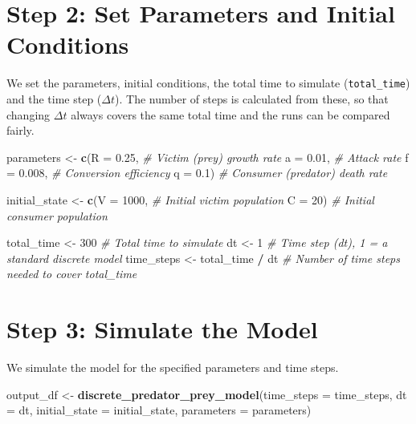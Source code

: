 \documentclass[
  a4paper]{book}
\newenvironment{Shaded}{\begin{snugshade}}{\end{snugshade}}
\newcommand{\AttributeTok}[1]{\textcolor[rgb]{0.13,0.29,0.53}{#1}}
\newcommand{\CommentTok}[1]{\textcolor[rgb]{0.56,0.35,0.01}{\textit{#1}}}
\newcommand{\DecValTok}[1]{\textcolor[rgb]{0.00,0.00,0.81}{#1}}
\newcommand{\FloatTok}[1]{\textcolor[rgb]{0.00,0.00,0.81}{#1}}
\newcommand{\FunctionTok}[1]{\textcolor[rgb]{0.13,0.29,0.53}{\textbf{#1}}}
\newcommand{\NormalTok}[1]{#1}
\newcommand{\OtherTok}[1]{\textcolor[rgb]{0.56,0.35,0.01}{#1}}
\newcommand{\SpecialCharTok}[1]{\textcolor[rgb]{0.81,0.36,0.00}{\textbf{#1}}}
\begin{document}
\section{Step 2: Set Parameters and Initial Conditions}\label{step-2-set-parameters-and-initial-conditions}

We set the parameters, initial conditions, the total time to simulate (\texttt{total\_time}) and the time step (\(\Delta t\)). The number of steps is calculated from these, so that changing \(\Delta t\) always covers the same total time and the runs can be compared fairly.

\begin{Shaded}
\begin{Highlighting}[]
\NormalTok{parameters }\OtherTok{\textless{}{-}} \FunctionTok{c}\NormalTok{(}\AttributeTok{R =} \FloatTok{0.25}\NormalTok{,  }\CommentTok{\# Victim (prey) growth rate}
                \AttributeTok{a =} \FloatTok{0.01}\NormalTok{,  }\CommentTok{\# Attack rate}
                \AttributeTok{f =} \FloatTok{0.008}\NormalTok{, }\CommentTok{\# Conversion efficiency}
                \AttributeTok{q =} \FloatTok{0.1}\NormalTok{)   }\CommentTok{\# Consumer (predator) death rate}

\NormalTok{initial\_state }\OtherTok{\textless{}{-}} \FunctionTok{c}\NormalTok{(}\AttributeTok{V =} \DecValTok{1000}\NormalTok{,  }\CommentTok{\# Initial victim population}
                   \AttributeTok{C =} \DecValTok{20}\NormalTok{)    }\CommentTok{\# Initial consumer population}

\NormalTok{total\_time }\OtherTok{\textless{}{-}} \DecValTok{300}             \CommentTok{\# Total time to simulate}
\NormalTok{dt }\OtherTok{\textless{}{-}} \DecValTok{1}                       \CommentTok{\# Time step (dt), 1 = a standard discrete model}
\NormalTok{time\_steps }\OtherTok{\textless{}{-}}\NormalTok{ total\_time }\SpecialCharTok{/}\NormalTok{ dt }\CommentTok{\# Number of time steps needed to cover total\_time}
\end{Highlighting}
\end{Shaded}

\section{Step 3: Simulate the Model}\label{step-3-simulate-the-model}

We simulate the model for the specified parameters and time steps.

\begin{Shaded}
\begin{Highlighting}[]
\NormalTok{output\_df }\OtherTok{\textless{}{-}} \FunctionTok{discrete\_predator\_prey\_model}\NormalTok{(}\AttributeTok{time\_steps =}\NormalTok{ time\_steps, }\AttributeTok{dt =}\NormalTok{ dt, }
                                          \AttributeTok{initial\_state =}\NormalTok{ initial\_state, }
                                          \AttributeTok{parameters =}\NormalTok{ parameters)}
\end{Highlighting}
\end{Shaded}
\end{document}
